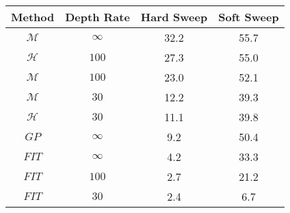 \centering \begin{tabular}{c|c|c|c}
Method	&Depth Rate	&Hard Sweep	&Soft Sweep\\\hline
$\mathcal{M}$	&$\infty$	&32.2	&55.7\\
$\mathcal{H}$	&$100$	&27.3	&55.0\\
$\mathcal{M}$	&$100$	&23.0	&52.1\\
$\mathcal{M}$	&$30$	&12.2	&39.3\\
$\mathcal{H}$	&$30$	&11.1	&39.8\\
$GP$	&$\infty$	&9.2	&50.4\\
$FIT$	&$\infty$	&4.2	&33.3\\
$FIT$	&$100$	&2.7	&21.2\\
$FIT$	&$30$	&2.4	&6.7\\
\end{tabular}
